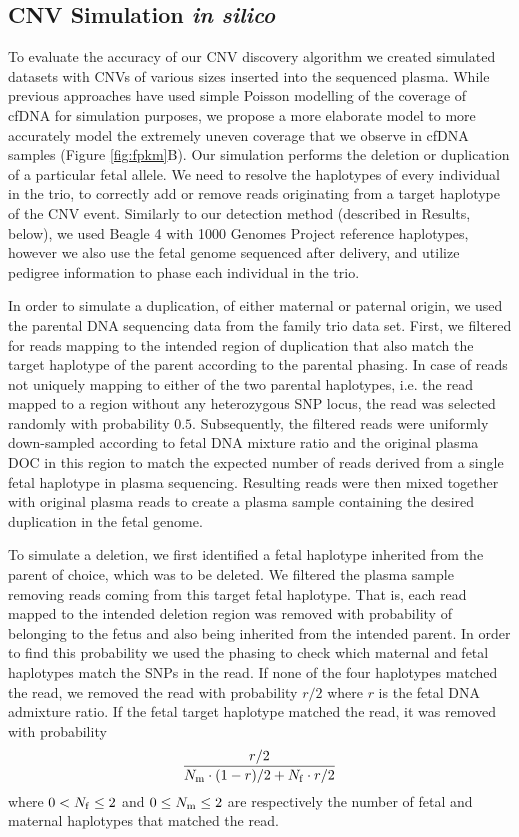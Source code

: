 \subsection{CNV Simulation \emph{in silico}}\label{ss:simulation}
To evaluate the accuracy of our CNV discovery algorithm we created simulated datasets with CNVs of various sizes inserted into the sequenced plasma. While previous approaches have used simple Poisson modelling of the coverage of cfDNA \cite{chen2013} for simulation purposes, we propose a more elaborate model to more accurately model the extremely uneven coverage that we observe in cfDNA samples (Figure \ref{fig:fpkm}B). Our simulation performs the deletion or duplication of a particular fetal allele.  We need to resolve the haplotypes of every individual in the trio, to correctly add or remove reads originating from a target haplotype of the CNV event. Similarly to our detection method (described in Results, below), we used Beagle 4 \cite{browning2013} with 1000 Genomes Project reference haplotypes, however we also use the fetal genome sequenced after delivery, and utilize pedigree information to phase each individual in the trio.

	In order to simulate a duplication, of either maternal or paternal origin, we used the parental DNA sequencing data from the family trio data set. First, we filtered for reads mapping to the intended region of duplication that also match the target haplotype of the parent according to the parental phasing. In case of reads not uniquely mapping to either of the two parental haplotypes, i.e. the read mapped to a region without any heterozygous SNP locus, the read was selected randomly with probability $0.5$. Subsequently, the filtered reads were uniformly down-sampled according to fetal DNA mixture ratio and the original plasma DOC in this region to match the expected number of reads derived from a single fetal haplotype in plasma sequencing. Resulting reads were then mixed together with original plasma reads to create a plasma sample containing the desired duplication in the fetal genome.
	
	To simulate a deletion, we first identified a fetal haplotype inherited from the parent of choice, which was to be deleted. We filtered the plasma sample removing reads coming from this target fetal haplotype. That is, each read mapped to the intended deletion region was removed with probability of belonging to the fetus and also being inherited from the intended parent. In order to find this probability we used the phasing to check which maternal and fetal haplotypes match the SNPs in the read. If none of the four haplotypes matched the read, we removed the read with probability $r/2$ where $r$ is the fetal DNA admixture ratio. If the fetal target haplotype matched the read, it was removed with probability
\begin{align}
\frac{ r/2 } { N_{\mathrm{m}} \cdot (1-r)/2 + N_{\mathrm{f}} \cdot r/2}
\end{align}
where $0 < N_{\mathrm{f}} \leq 2$ and $0 \leq N_{\mathrm{m}} \leq 2$ are respectively the number of fetal and maternal haplotypes that matched the read.
	
